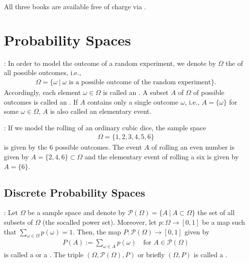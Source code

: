\documentclass[letterpaper,10pt,english]{jupyterBook}
\begin{document}
\sphinxAtStartPar
All three books are available free of charge via .


\section{Probability Spaces}
\label{\detokenize{fund/fundprob:probability-spaces}}
\sphinxAtStartPar
{}: In order to model the outcome of a random experiment, we denote by \(\Omega\) the  of all possible outcomes, i.e.,
\begin{equation*}
\begin{split}\Omega = \{ \omega ~|~ \omega \text{ is a possible outcome of the random experiment}\}.\end{split}
\end{equation*}
\sphinxAtStartPar
Accordingly, each element \(\omega \in \Omega\) is called an . A subset \(A\) of \(\Omega\) of possible outcomes is called an . If \(A\) contains only a single outcome \(\omega\), i.e., \(A=\{\omega\}\) for some \(\omega \in \Omega\), \(A\) is also called an elementary event.

\sphinxAtStartPar
{}: If we model the rolling of an ordinary cubic dice, the sample space
\begin{equation*}
\begin{split}\Omega= \{1, 2, 3, 4, 5, 6\}\end{split}
\end{equation*}
\sphinxAtStartPar
is given by the 6 possible outcomes. The event \(A\) of rolling an even number is given by \(A = \{2, 4, 6\} \subset \Omega\) and the elementary event of rolling a six is given by \(A=\{6\}\).


\subsection{Discrete Probability Spaces}
\label{\detokenize{fund/fundprob:discrete-probability-spaces}}
\sphinxAtStartPar
{}: Let \(\Omega\) be a  sample space and denote by \(\mathcal{P}(\Omega) = \{A~|~A \subset \Omega\}\) the set of all subsets of \(\Omega\) (the so\sphinxhyphen{}called power set). Moreover, let \(p: \Omega \rightarrow [0, 1]\) be a map such that \(\sum_{\omega \in \Omega} p(\omega) = 1\). Then, the map \(P: \mathcal{P}(\Omega) \rightarrow [0,1]\) given by
\begin{equation*}
\begin{split} P(A) := \sum_{\omega \in A} p(\omega) \quad \text{for } A \in \mathcal{P}(\Omega)\end{split}
\end{equation*}
\sphinxAtStartPar
is called a  or a . The triple \((\Omega, \mathcal{P}(\Omega), P)\) or briefly \((\Omega, P)\) is called a .
\end{document}
